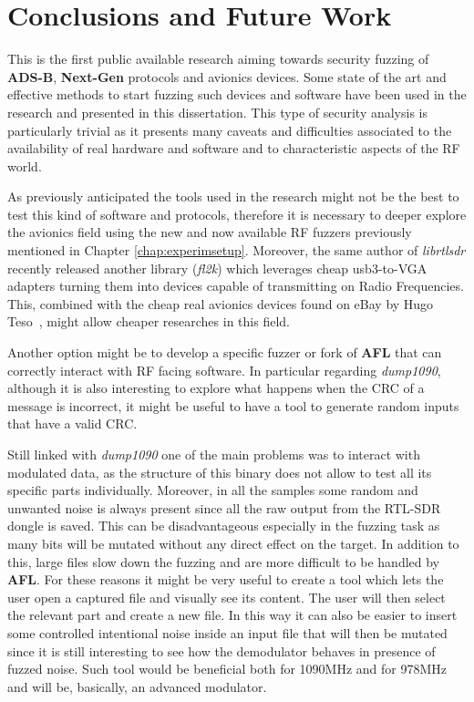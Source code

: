 \documentclass[../main.tex]{subfiles}
\begin{document}
\chapter{Conclusions and Future Work}
\label{chap:futurework}

This is the first public available research aiming towards security fuzzing of \textbf{ADS-B}, \textbf{Next-Gen} protocols and avionics devices.
Some state of the art and effective methods to start fuzzing such devices and software have been used in the research and presented in this dissertation. This type of security analysis is particularly trivial as it presents many caveats and difficulties associated to the availability of real hardware and software and to characteristic aspects of the RF world.

As previously anticipated the tools used in the research might not be the best to test this kind of software and protocols, therefore it is necessary to deeper explore the avionics field using the new and now available RF fuzzers previously mentioned in Chapter \ref{chap:experimsetup}. Moreover, the same author of \textit{librtlsdr} recently released another library (\textit{fl2k}\cite{fl2k}) which leverages cheap usb3-to-VGA adapters turning them into devices capable of transmitting on Radio Frequencies. This, combined with the cheap real avionics devices found on eBay by Hugo Teso~\cite{teso}, might allow cheaper researches in this field.

 Another option might be to develop a specific fuzzer or fork of \textbf{AFL} that can correctly interact with RF facing software. In particular regarding \textit{dump1090}, although it is also interesting to explore what happens when the CRC of a message is incorrect, it might be useful to have a tool to generate random inputs that have a valid CRC.

Still linked with \textit{dump1090} one of the main problems was to interact with modulated data, as the structure of this binary does not allow to test all its specific parts individually. Moreover, in all the samples some random and unwanted noise is always present since all the raw output from the RTL-SDR dongle is saved. This can be disadvantageous especially in the fuzzing task as many bits will be mutated without any direct effect on the target. In addition to this, large files slow down the fuzzing and are more difficult to be handled by \textbf{AFL}. For these reasons it might be very useful to create a tool which lets the user open a captured file and visually see its content. The user will then select the relevant part and create a new file. In this way it can also be easier to insert some controlled intentional noise inside an input file that will then be mutated since it is still interesting to see how the demodulator behaves in presence of fuzzed noise. Such tool would be beneficial both for 1090MHz and for 978MHz and will be, basically, an advanced modulator.
\end{document}
